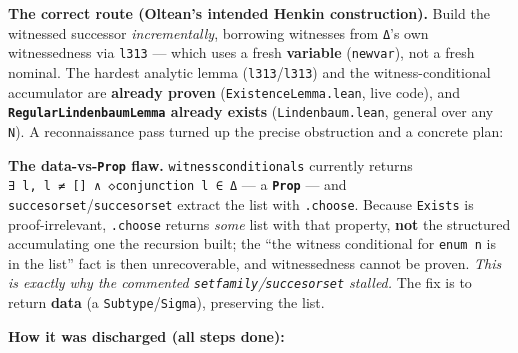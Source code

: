 \documentclass[11pt,a4paper]{article}
\renewcommand{\_}{\origtextunderscore\allowbreak}
\begin{document}
\textbf{The correct route (Oltean's intended Henkin construction).} Build the witnessed successor \emph{incrementally}, borrowing witnesses from \texttt{Δ}'s own witnessedness via \texttt{l313\textquotesingle{}} --- which uses a fresh \textbf{variable} (\texttt{new\_var}), not a fresh nominal. The hardest analytic lemma (\texttt{l313}/\texttt{l313\textquotesingle{}}) and the witness-conditional accumulator are \textbf{already proven} (\texttt{ExistenceLemma.lean}, live code), and \textbf{\texttt{RegularLindenbaumLemma} already exists} (\texttt{Lindenbaum.lean}, general over any \texttt{N}). A reconnaissance pass turned up the precise obstruction and a concrete plan:

\textbf{The data-vs-\texttt{Prop} flaw.} \texttt{witness\_conditionals} currently returns \texttt{∃\ l,\ l\ ≠\ {[}{]}\ ∧\ ◇conjunction\textquotesingle{}\ l\ ∈\ Δ} --- a \textbf{\texttt{Prop}} --- and \texttt{succesor\_set}/\texttt{succesor\_set\textquotesingle{}} extract the list with \texttt{.choose}. Because \texttt{Exists} is proof-irrelevant, \texttt{.choose} returns \emph{some} list with that property, \textbf{not} the structured accumulating one the recursion built; the ``the witness conditional for \texttt{enum\ n} is in the list'' fact is then unrecoverable, and witnessedness cannot be proven. \emph{This is exactly why the commented \texttt{set\_family}/\texttt{succesor\_set} stalled.} The fix is to return \textbf{data} (a \texttt{Subtype}/\texttt{Sigma}), preserving the list.

\textbf{How it was discharged (all steps done):}
\end{document}
